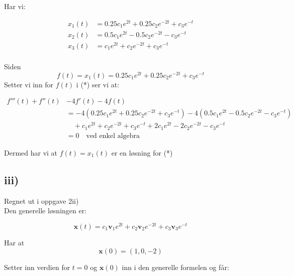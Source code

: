 \documentclass[a4paper, norsk, twoside, 10pt]{article}
\begin{document}
\begin{flushleft}
  Har vi:

  \begin{align*}
    x_{1}(t) &= 0.25c_{1}e^{2t} + 0.25c_{2}e^{-2t} + c_{3}e^{-t} \\
    x_{2}(t) &= 0.5c_{1}e^{2t} - 0.5c_{2}e^{-2t} - c_{3}e^{-t} \\
    x_{3}(t) &=c_{1}e^{2t} + c_{2}e^{-2t} + c_{3}e^{-t} \\
  \end{align*}

  Siden \[f(t) = x_{1}(t)  =0.25c_{1}e^{2t} + 0.25c_{2}e^{-2t} + c_{3}e^{-t}  \]
  Setter vi inn for $f(t)$ i (*) ser vi at:

  \begin{align*}
    f'''(t) +f''(t) &-4f'(t) -4f(t) \\&= -4(0.25c_{1}e^{2t} + 0.25c_{2}e^{-2t} + c_{3}e^{-t}) -4(0.5c_{1}e^{2t} - 0.5c_{2}e^{-2t} - c_{3}e^{-t} )\\ &\quad+ c_{1}e^{2t} + c_{2}e^{-2t} + c_{3}e^{-t} + 2c_{1}e^{2t}  -2c_{2}e^{-2t} - c_{3}e^{-t} \\
    &= 0 \quad \text{ved enkel algebra}
  \end{align*}

  Dermed har vi at $f(t) = x_{1}(t)$ er en løsning for (*)


  \subsection*{iii)}

  Regnet ut i oppgave 2ii)\\ Den generelle løsningen er:

  \[\mathbf{x}(t) = c_{1}\mathbf{v}_{1}e^{2t} + c_{2}\mathbf{v}_{2}e^{-2t} + c_{3}\mathbf{v}_{3}e^{-t} \]


  Har at \[\mathbf{x}(0) = (1 , 0 , -2)\]

  Setter inn verdien for $t = 0$ og $\mathbf{x}(0)$ inn i den generelle formelen og får:


\end{flushleft}
\end{document}
